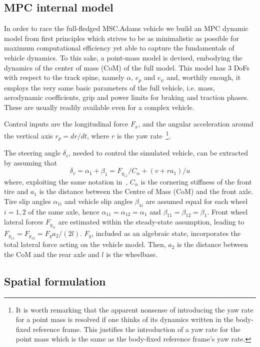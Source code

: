 \documentclass[conference]{IEEEtran} %
\begin{document}
\subsection{MPC internal model}

In order to race the full-fledged MSC.Adams vehicle we build an MPC dynamic model from first principles which strives to be as minimalistic as possible for maximum computational efficiency yet able to capture the fundamentals of vehicle dynamics. To this sake, a point-mass model is devised, embodying the dynamics of the center of mass (CoM) of the full model.
This model has 3 DoFs with respect to the track spine, namely $\alpha$, $e_p$ and $e_{\psi}$ and, worthily enough, it employs the very same basic parameters of the full vehicle, i.e. mass, aerodynamic coefficients, grip and power limits for braking and traction phases. These are usually readily available even for a complex vehicle.

Control inputs are the longitudinal force $F_{x}$, and the angular acceleration around the vertical axis $r_p = dr/dt$, where $r$ is the yaw rate~\footnote{It is worth remarking that the apparent nonsense of introducing the yaw rate for a point mass is resolved if one thinks of its dynamics written in the body-fixed reference frame. This justifies the introduction of a yaw rate for the point mass which is the same as the body-fixed reference frame's yaw rate.}.

The steering angle $\delta_v$, needed to control the simulated vehicle, can be extracted by assuming that
\begin{equation}
\delta_v = \alpha_{1} + \beta_1 = F_{y_{11}}/C_\alpha + (v + ra_1)/u
\end{equation}
where, exploiting the same notation in~\cite{Guiggiani2018}, $C_\alpha$ is the cornering stiffness of the front tire and $a_1$ is the distance between the Centre of Mass (CoM) and the front axle.
Tire slip angles $\alpha_{1i}$ and vehicle slip angles $\beta_{1i}$ are assumed equal for each wheel $i=1, 2$ of the same axle, hence $\alpha_{11} = \alpha_{12} = \alpha_{1}$ and $\beta_{11} = \beta_{12} = \beta_{1}$.
%
Front wheel lateral forces $F_{y_{1i}}$ are estimated within the steady-state assumption, leading to $F_{y_{11}} = F_{y_{12}} = F_{y}a_2/(2l)$.
$F_{y}$, included as an algebraic state, incorporates the total lateral force acting on the vehicle model. Then, $a_2$ is the distance between the CoM and the rear axle and $l$ is the wheelbase.

\subsection{Spatial formulation}
\end{document}

